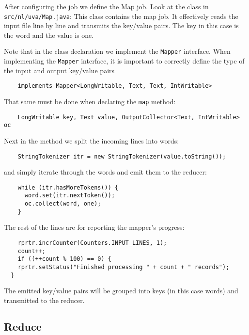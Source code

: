 \documentclass[a4paper,10pt]{article}
\begin{document}
  After configuring the job we define the Map job. Look at the class in \texttt{src/nl/uva/Map.java}: This class contains the map job. It effectively reads the input file line by line and transmits the key/value pairs. The key in this case is the word and the value is one.
  
  Note that in the class declaration we implement the \texttt{Mapper} interface. When implementing the \texttt{Mapper} interface, it is important to correctly define the type of the input and output key/value pairs
  \begin{lstlisting}
    implements Mapper<LongWritable, Text, Text, IntWritable> 
  \end{lstlisting}
  
  That same must be done when declaring the \texttt{map} method:
  \begin{lstlisting}
    LongWritable key, Text value, OutputCollector<Text, IntWritable> oc
  \end{lstlisting}
  
  
  Next in the method we split the incoming lines into words:
  \begin{lstlisting}
    StringTokenizer itr = new StringTokenizer(value.toString());
  \end{lstlisting}
  
  and simply iterate through the words and emit them to the reducer: 
  \begin{lstlisting}
    while (itr.hasMoreTokens()) {
      word.set(itr.nextToken());
      oc.collect(word, one);
    }
  \end{lstlisting}
  
  
  The rest of the lines are for reporting the mapper's progress:
  
  \begin{lstlisting}
    rprtr.incrCounter(Counters.INPUT_LINES, 1);
    count++;
    if ((++count % 100) == 0) {
    rprtr.setStatus("Finished processing " + count + " records");
  }
\end{lstlisting}


The emitted key/value pairs will be grouped into keys (in this case words) and transmitted to the reducer. 
% 

\subsection{Reduce}
\end{document}
